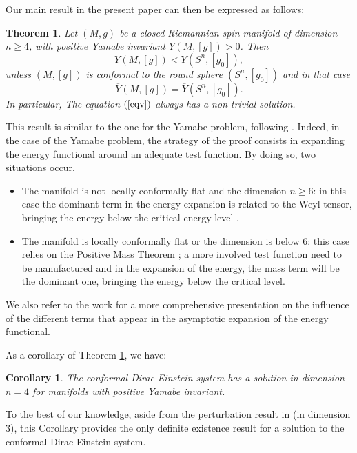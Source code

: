 \documentclass[11pt]{article}
\newtheorem{theorem}{Theorem}[section]
\newtheorem{corollary}{Corollary}[section]
\begin{document}
{\noindent
Our main result in the present paper can then be expressed as follows:
\begin{theorem}\label{main}
Let $(M,g)$ be a closed Riemannian spin manifold of dimension $n \geq 4$, with positive Yamabe invariant $Y(M,[g])>0$. Then $$\overline{Y}(M,[g])<\overline{Y}(S^{n},[g_{0}]),$$ 
unless $(M,[g])$ is conformal to the round sphere $(S^{n},[g_{0}])$ and in that case $$\overline{Y}(M,[g])=\overline{Y}(S^{n},[g_{0}]).$$ In particular, The equation $(\ref{eqv})$ always has a non-trivial solution.
\end{theorem}


\noindent
This result is similar to the one for the Yamabe problem, following \cite{LP}. Indeed, in the case of the Yamabe problem, the strategy of the proof consists in expanding the energy functional around an adequate test function. By doing so, two situations occur.
\begin{itemize}
\item The manifold is not locally conformally flat and the dimension $n\geq 6$: in this case the dominant term in the energy expansion is related to the Weyl tensor, bringing the energy below the critical energy level \cite{Au}.
\item The manifold is locally conformally flat or the dimension is below 6: this case relies on the Positive Mass Theorem \cite{S,W}; a more involved test function need to be manufactured and in the expansion of the energy, the mass term will be the dominant one, bringing the energy below the critical level.
\end{itemize}
We also refer to the work \cite{NSS} for a more comprehensive presentation on the influence of the different terms that appear in the asymptotic expansion of the energy functional.


\noindent
As a corollary of Theorem \ref{main}, we have:
\begin{corollary}
The conformal Dirac-Einstein system has a solution in dimension $n=4$ for manifolds with positive Yamabe invariant.
\end{corollary}


\noindent
To the best of our knowledge, aside from the perturbation result in \cite{GuidiMaalaouiMartino2021} (in dimension 3), this Corollary provides the only definite existence result for a solution to the conformal Dirac-Einstein system.



}
\end{document}
